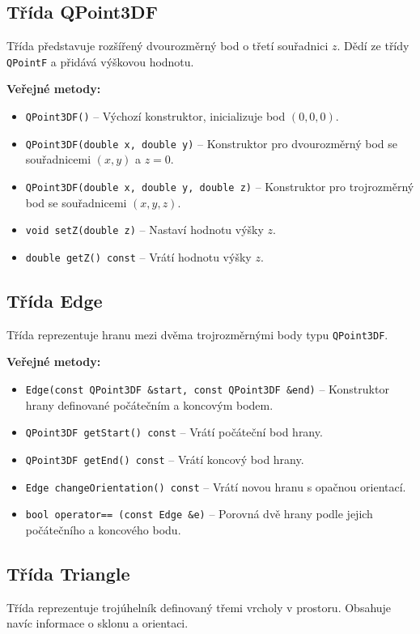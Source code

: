 \subsection{Třída QPoint3DF}
Třída představuje rozšířený dvourozměrný bod o třetí souřadnici $z$. Dědí ze třídy \texttt{QPointF} a přidává výškovou hodnotu.

\textbf{Veřejné metody:}
\begin{itemize}
\item \texttt{QPoint3DF()} – Výchozí konstruktor, inicializuje bod $(0,0,0)$.
\item \texttt{QPoint3DF(double x, double y)} – Konstruktor pro dvourozměrný bod se souřadnicemi $(x,y)$ a $z = 0$.
\item \texttt{QPoint3DF(double x, double y, double z)} – Konstruktor pro trojrozměrný bod se souřadnicemi $(x,y,z)$.
\item \texttt{void setZ(double z)} – Nastaví hodnotu výšky $z$.
\item \texttt{double getZ() const} – Vrátí hodnotu výšky $z$.
\end{itemize}

\subsection{Třída Edge}
Třída reprezentuje hranu mezi dvěma trojrozměrnými body typu \texttt{QPoint3DF}.

\textbf{Veřejné metody:}
\begin{itemize}
\item \texttt{Edge(const QPoint3DF \&start, const QPoint3DF \&end)} – Konstruktor hrany definované počátečním a koncovým bodem.
\item \texttt{QPoint3DF getStart() const} – Vrátí počáteční bod hrany.
\item \texttt{QPoint3DF getEnd() const} – Vrátí koncový bod hrany.
\item \texttt{Edge changeOrientation() const} – Vrátí novou hranu s opačnou orientací.
\item \texttt{bool operator== (const Edge \&e)} – Porovná dvě hrany podle jejich počátečního a koncového bodu.
\end{itemize}

\subsection{Třída Triangle}
Třída reprezentuje trojúhelník definovaný třemi vrcholy v prostoru. Obsahuje navíc informace o sklonu a orientaci.

